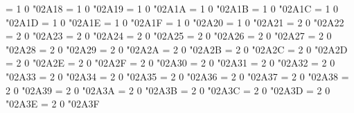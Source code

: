 \Umathchardef\intx = 1 0 "02A18 %
\Umathchardef\intcap = 1 0 "02A19 %
\Umathchardef\intcup = 1 0 "02A1A %
\Umathchardef\upint = 1 0 "02A1B %
\Umathchardef\lowint = 1 0 "02A1C %
\Umathchardef\Join = 1 0 "02A1D %
\Umathchardef\bigtriangleleft = 1 0 "02A1E %
\Umathchardef\zcmp = 1 0 "02A1F %
\Umathchardef\zpipe = 1 0 "02A20 %
\Umathchardef\zproject = 1 0 "02A21 %
\Umathchardef\ringplus = 2 0 "02A22 %
\Umathchardef\plushat = 2 0 "02A23 %
\Umathchardef\simplus = 2 0 "02A24 %
\Umathchardef\plusdot = 2 0 "02A25 %
\Umathchardef\plussim = 2 0 "02A26 %
\Umathchardef\plussubtwo = 2 0 "02A27 %
\Umathchardef\plustrif = 2 0 "02A28 %
\Umathchardef\commaminus = 2 0 "02A29 %
\Umathchardef\minusdot = 2 0 "02A2A %
\Umathchardef\minusfdots = 2 0 "02A2B %
\Umathchardef\minusrdots = 2 0 "02A2C %
\Umathchardef\opluslhrim = 2 0 "02A2D %
\Umathchardef\oplusrhrim = 2 0 "02A2E %
\Umathchardef\vectimes = 2 0 "02A2F %
\Umathchardef\dottimes = 2 0 "02A30 %
\Umathchardef\timesbar = 2 0 "02A31 %
\Umathchardef\btimes = 2 0 "02A32 %
\Umathchardef\smashtimes = 2 0 "02A33 %
\Umathchardef\otimeslhrim = 2 0 "02A34 %
\Umathchardef\otimesrhrim = 2 0 "02A35 %
\Umathchardef\otimeshat = 2 0 "02A36 %
\Umathchardef\Otimes = 2 0 "02A37 %
\Umathchardef\odiv = 2 0 "02A38 %
\Umathchardef\triangleplus = 2 0 "02A39 %
\Umathchardef\triangleminus = 2 0 "02A3A %
\Umathchardef\triangletimes = 2 0 "02A3B %
\Umathchardef\intprod = 2 0 "02A3C %
\Umathchardef\intprodr = 2 0 "02A3D %
\Umathchardef\fcmp = 2 0 "02A3E %
\Umathchardef\amalg = 2 0 "02A3F %
